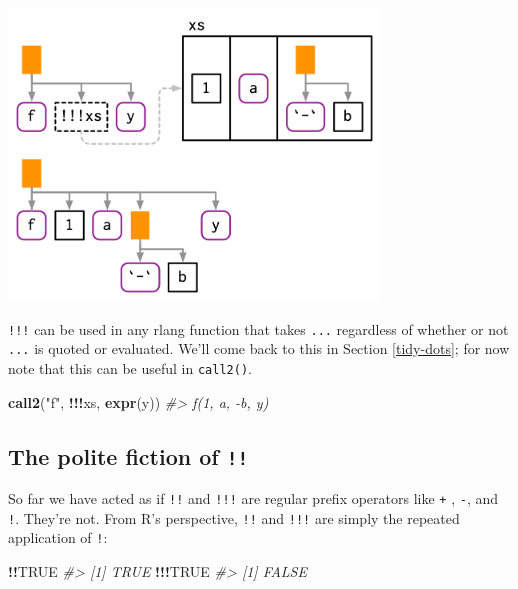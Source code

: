 \documentclass[]{book}
\newenvironment{Shaded}{\begin{snugshade}}{\end{snugshade}}
\newcommand{\CommentTok}[1]{\textcolor[rgb]{0.37,0.37,0.37}{\textit{#1}}}
\newcommand{\KeywordTok}[1]{\textcolor[rgb]{0.27,0.27,0.27}{\textbf{#1}}}
\newcommand{\NormalTok}[1]{#1}
\newcommand{\OperatorTok}[1]{\textcolor[rgb]{0.43,0.43,0.43}{\textbf{#1}}}
\newcommand{\OtherTok}[1]{\textcolor[rgb]{0.37,0.37,0.37}{#1}}
\newcommand{\StringTok}[1]{\textcolor[rgb]{0.5,0.5,0.5}{#1}}
\begin{document}
\begin{center}\includegraphics[width=3.89in]{diagrams/quotation/bang-bang-bang} \end{center}

\texttt{!!!} can be used in any rlang function that takes \texttt{...} regardless of whether or not \texttt{...} is quoted or evaluated. We'll come back to this in Section \ref{tidy-dots}; for now note that this can be useful in \texttt{call2()}.

\begin{Shaded}
\begin{Highlighting}[]
\KeywordTok{call2}\NormalTok{(}\StringTok{"f"}\NormalTok{, }\OperatorTok{!!!}\NormalTok{xs, }\KeywordTok{expr}\NormalTok{(y))}
\CommentTok{#> f(1, a, -b, y)}
\end{Highlighting}
\end{Shaded}

\hypertarget{the-polite-fiction-of}{%
\subsection{\texorpdfstring{The polite fiction of \texttt{!!}}{The polite fiction of !!}}\label{the-polite-fiction-of}}

So far we have acted as if \texttt{!!} and \texttt{!!!} are regular prefix operators like \texttt{+} , \texttt{-}, and \texttt{!}. They're not. From R's perspective, \texttt{!!} and \texttt{!!!} are simply the repeated application of \texttt{!}:

\begin{Shaded}
\begin{Highlighting}[]
\OperatorTok{!!}\OtherTok{TRUE}
\CommentTok{#> [1] TRUE}
\OperatorTok{!!!}\OtherTok{TRUE}
\CommentTok{#> [1] FALSE}
\end{Highlighting}
\end{Shaded}
\end{document}
